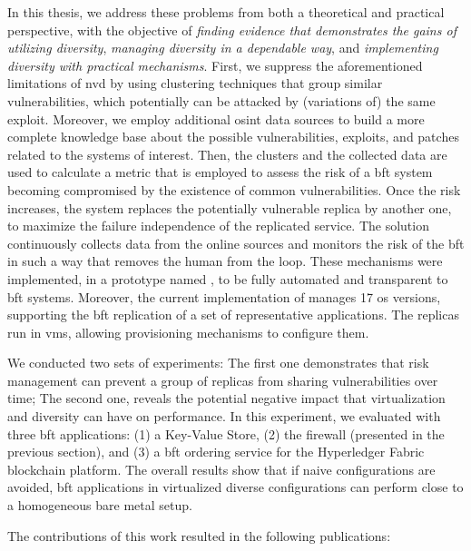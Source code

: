 In this thesis, we address these problems from both a theoretical and practical perspective, with the objective of \emph{finding evidence that demonstrates the gains of utilizing diversity}, \emph{managing diversity in a dependable way}, and \emph{implementing diversity with practical mechanisms}.
First, we suppress the aforementioned limitations of \gls{nvd} by using clustering techniques that group similar vulnerabilities, which potentially can be attacked by (variations of) the same exploit.
Moreover, we employ additional \gls{osint} data sources to build a more complete knowledge base about the possible vulnerabilities, exploits, and patches related to the systems of interest. 
Then, the clusters and the collected data are used to calculate a metric that is employed to assess the risk of a \gls{bft} system becoming compromised by the existence of common vulnerabilities.
Once the risk increases, the system replaces the potentially vulnerable replica by another one, to maximize the failure independence of the replicated service.
The solution continuously collects data from the online sources and monitors the risk of the \gls{bft} in such a way that removes the human from the loop.
These mechanisms were implemented, in a prototype named \system, to be fully automated and transparent to \gls{bft} systems.
Moreover, the current implementation of \system manages 17 \gls{os} versions, supporting the \gls{bft} replication of a set of representative applications.
The replicas run in \glspl{vm}, allowing provisioning mechanisms to configure them. 


We conducted two sets of experiments: The first one demonstrates that \system risk management can prevent a group of replicas from sharing vulnerabilities over time; 
The second one, reveals the potential negative impact that virtualization and diversity can have on performance. 
In this experiment, we evaluated \system with three \gls{bft} applications: (1) a Key-Value Store, (2) the \sieveq firewall (presented in the previous section), and (3) a \gls{bft} ordering service for the Hyperledger Fabric blockchain platform.
The overall results show that if naive configurations are avoided, \gls{bft} applications in virtualized diverse configurations can perform close to a homogeneous bare metal setup.

The contributions of this work resulted in the following publications:

